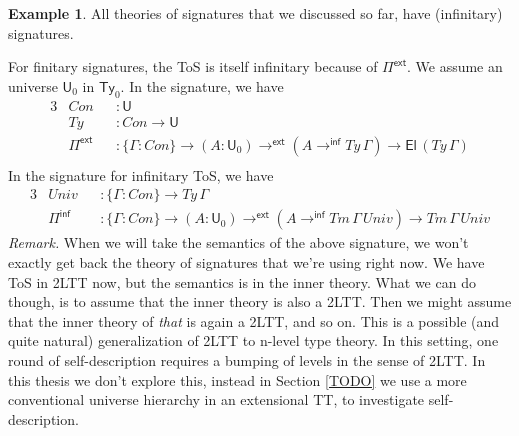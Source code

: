 \documentclass[12pt,a4paper,twoside,openany]{book}
\theoremstyle{remark}
\theoremstyle{definition}
\newtheorem{myexample}{Example}
\theoremstyle{theorem}
\newcommand{\mi}[1]{\mathit{#1}}
\newcommand{\ms}[1]{\mathsf{#1}}
\newcommand{\Ty}{\mathsf{Ty}}
\newcommand{\U}{\mathsf{U}}
\newcommand{\El}{\mathsf{El}}
\newcommand{\Pie}{\Pi^{\mathsf{ext}}}
\newcommand{\toe}{\to^{\ms{ext}}}
\newcommand{\Piinf}{\Pi^{\mathsf{inf}}}
\newcommand{\toinf}{\to^{\ms{inf}}}
\begin{document}
\begin{myexample}
All theories of signatures that we discussed so far, have (infinitary)
signatures.

For finitary signatures, the ToS is itself infinitary because of $\Pie$. We
assume an universe $\U_0$ in $\Ty_0$. In the signature, we have
\begin{alignat*}{3}
  &\mi{Con} &&: \U \\
  &\mi{Ty} &&: \mi{Con} \to \U\\
  &\Pie &&: \{\Gamma : \mi{Con}\} \to (A : \U_0) \toe (A \toinf \mi{Ty}\,\Gamma) \to \El\,(\mi{Ty}\,\Gamma)\\
\end{alignat*}
In the signature for infinitary ToS, we have
\begin{alignat*}{3}
  &\mi{Univ} &&: \{\Gamma : \mi{Con}\} \to \mi{Ty}\,\Gamma\\
  &\Piinf    &&: \{\Gamma : \mi{Con}\} \to (A : \U_0) \toe (A \toinf \mi{Tm}\,\Gamma\,\mi{Univ}) \to \mi{Tm}\,\Gamma\,\mi{Univ}
\end{alignat*}
\emph{Remark.}
When we will take the semantics of the above signature, we won't
exactly get back the theory of signatures that we're using right now. We have
ToS in 2LTT now, but the semantics is in the inner theory. What we can do
though, is to assume that the inner theory is also a 2LTT. Then we might assume
that the inner theory of \emph{that} is again a 2LTT, and so on. This is a
possible (and quite natural) generalization of 2LTT to n-level type theory. In
this setting, one round of self-description requires a bumping of levels in the
sense of 2LTT. In this thesis we don't explore this, instead in Section
\ref{TODO} we use a more conventional universe hierarchy in an extensional TT,
to investigate self-description.
\end{myexample}
\end{document}

